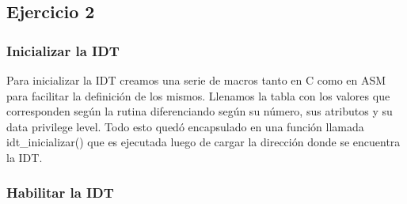 \subsection{Ejercicio 2}

\subsubsection{Inicializar la IDT}

Para inicializar la IDT creamos una serie de macros tanto en C como en ASM para facilitar la definición de los mismos. Llenamos la tabla con los valores que corresponden según la rutina diferenciando según su número, sus atributos y su data privilege level. Todo esto quedó encapsulado en una función llamada idt_inicializar() que es ejecutada luego de cargar la dirección donde se encuentra la IDT.

\subsubsection{Habilitar la IDT}

